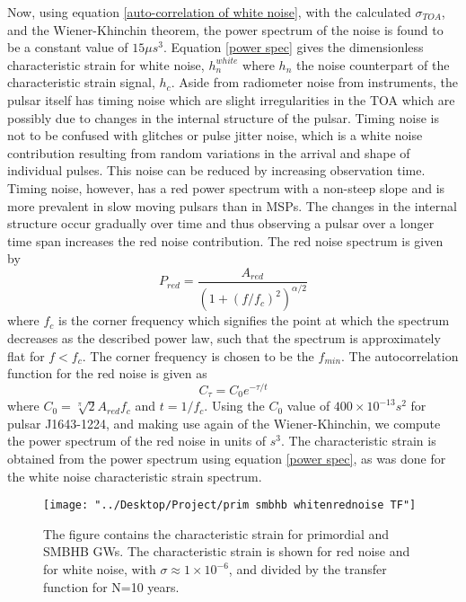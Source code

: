 \documentclass[12pt]{article}
\begin{document}
	Now, using equation \ref{auto-correlation of white noise}, with the calculated $\sigma_{TOA}$, and the Wiener-Khinchin theorem, the power spectrum of the noise is found to be a constant value of $15 \mu s^3$. Equation \ref{power spec} gives the dimensionless characteristic strain for white noise, $h_{n}^{white}$ where $h_{n}$ the noise counterpart of the characteristic strain signal, $h_{c}$. Aside from radiometer noise from instruments, the pulsar itself has timing noise which are slight irregularities in the TOA which are possibly due to changes in the internal structure of the pulsar. Timing noise is not to be confused with glitches or pulse jitter noise, which is a white noise contribution resulting from random variations in the arrival and shape of individual pulses. This noise can be reduced by increasing observation time. Timing noise, however, has a red power spectrum with a non-steep slope and is more prevalent in slow moving pulsars than in MSPs. The changes in the internal structure occur gradually over time and thus observing a pulsar over a longer time span increases the red noise contribution. The red noise spectrum is given by
	\begin{equation}
	P_{red}=\frac{A_{red}}{{(1+{(f/f_c)}^2)}^{\alpha/2}}
	\end{equation}
	where $f_{c}$ is the corner frequency which signifies the point at which the spectrum decreases as the described power law, such that the spectrum is approximately flat for $f<f_{c}$. The corner frequency is chosen to be the $f_{min}$.
	The autocorrelation function for the red noise is given as
	\begin{equation}\label{autocorr for red noise}
	C_{\tau}=C_0 e^{-\tau/t}
	\end{equation}
	where $C_0=\sqrt[\pi]{2}A_{red}f_{c}$ and $t=1/f_{c}$. Using the $C_0$ value of $400 \times 10^{-13} s^2$ for pulsar J1643-1224, and making use again of the Wiener-Khinchin, we compute the power spectrum of the red noise in units of $s^3$. The characteristic strain is obtained from the power spectrum using equation \ref{power spec}, as was done for the white noise characteristic strain spectrum.
\begin{figure}[th!]
	\texttt{[image: "../Desktop/Project/prim smbhb whitenrednoise TF"]}
	\caption{\label{fig:prim_smbhb_whitenrednoise_TF.png} The figure contains the characteristic strain for primordial and SMBHB GWs. The characteristic strain is shown for red noise and for white noise, with $\sigma \approx 1 \times 10^{-6}$, and divided by the transfer function for N=10 years.}
	\label{fig:prim-smbhb-whitenrednoise-tf}
\end{figure}
\end{document}
